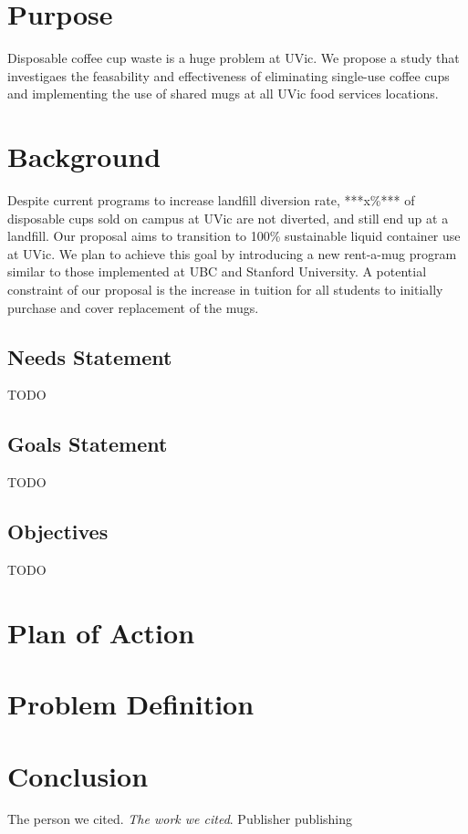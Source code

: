 \documentclass[letterpaper,11pt]{texMemo} %
\begin{document}
\maketitle %


\section*{Purpose}
Disposable coffee cup waste is a huge problem at UVic. We propose a study
that investigaes the feasability and effectiveness of eliminating single-use
coffee cups and implementing the use of shared mugs at all UVic food services
locations.
\section*{Background}
Despite current programs to increase landfill diversion rate, ***x\%*** of
disposable cups sold on campus at UVic are not diverted, and still end up at a
landfill.\cite{myrefitem} Our proposal aims to transition to 100\% sustainable
liquid container use at UVic. We plan to achieve this goal by introducing a
new rent-a-mug program similar to those implemented at UBC and Stanford
University. A potential constraint of our proposal is the increase in
tuition for all students to initially purchase and cover replacement of the
mugs.
\subsection*{Needs Statement}
TODO
\subsection*{Goals Statement}
TODO
\subsection*{Objectives}
TODO

\section*{Plan of Action}
\section*{Problem Definition}


\section*{Conclusion}

\begin{thebibliography}{9}
		The person we cited.
		\textit{The work we cited}.
		Publisher publishing
\end{thebibliography}
\end{document}
